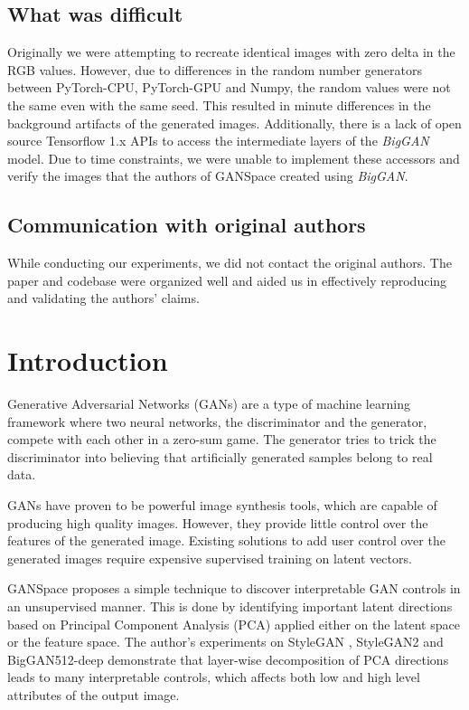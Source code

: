 \subsection*{What was difficult}

Originally we were attempting to recreate identical images with zero delta in the RGB values. However, due to differences in the random number generators between PyTorch-CPU, PyTorch-GPU and Numpy, the random values were not the same even with the same seed. This resulted in minute differences in the background artifacts of the generated images. Additionally, there is a lack of open source Tensorflow 1.x APIs to access the intermediate layers of the \textit{BigGAN} model. Due to time constraints, we were unable to implement these accessors and verify the images that the authors of GANSpace created using \textit{BigGAN}.

\subsection*{Communication with original authors}

While conducting our experiments, we did not contact the original authors. The paper and codebase were organized well and aided us in effectively reproducing and validating the authors' claims.

\newpage

\section{Introduction}

Generative Adversarial Networks (GANs) \cite{gan} are a type of machine learning framework where two neural networks, the discriminator and the generator, compete with each other in a zero-sum game. The generator tries to trick the discriminator into believing that artificially generated samples belong to real data.

GANs have proven to be powerful image synthesis tools, which are capable of producing high quality images. However, they provide little control over the features of the generated image. Existing solutions to add user control over the generated images require expensive supervised training on latent vectors.

GANSpace \cite{ganspace} proposes a simple technique to discover interpretable GAN controls in an unsupervised manner. This is done by identifying important latent directions based on Principal Component Analysis (PCA) applied either on the latent space or the feature space. The author's experiments on StyleGAN \cite{stylegan}, StyleGAN2 \cite{stylegan2} and BigGAN512-deep \cite{biggan} demonstrate that layer-wise decomposition of PCA directions leads to many interpretable controls, which affects both low and high level attributes of the output image.



